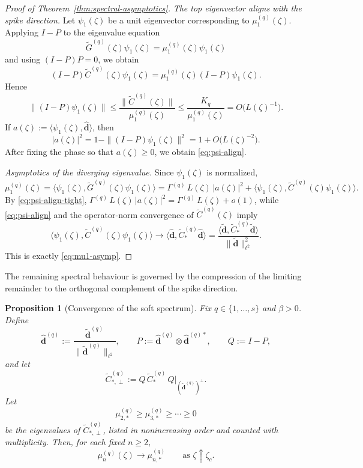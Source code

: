 \documentclass[11pt]{amsart}
\numberwithin{equation}{section}
\theoremstyle{plain}
\newtheorem{proposition}[theorem]{Proposition}
\theoremstyle{definition}
\theoremstyle{remark}
\begin{document}
\begin{proof}[Proof of Theorem~\ref{thm:spectral-asymptotics}]
	\smallskip
	\noindent\emph{The top eigenvector aligns with the spike direction.}
	Let \(\psi_1(\zeta)\) be a unit eigenvector corresponding to
	\(\mu_1^{(q)}(\zeta)\). Applying \(I-P\) to the eigenvalue equation
	\[
		\widetilde G^{(q)}(\zeta)\psi_1(\zeta)
		=
		\mu_1^{(q)}(\zeta)\psi_1(\zeta)
	\]
	and using \((I-P)P=0\), we obtain
	\[
		(I-P)\widetilde C^{(q)}(\zeta)\psi_1(\zeta)
		=
		\mu_1^{(q)}(\zeta)(I-P)\psi_1(\zeta).
	\]
	Hence
	\begin{equation}\label{eq:psi-align-tight}
		\|(I-P)\psi_1(\zeta)\|
		\le
		\frac{\|\widetilde C^{(q)}(\zeta)\|}{\mu_1^{(q)}(\zeta)}
		\le
		\frac{K_q}{\mu_1^{(q)}(\zeta)}
		=
		O\bigl(L(\zeta)^{-1}\bigr).
	\end{equation}
	If $a(\zeta):=\langle \psi_1(\zeta),\widehat{\bm d}\rangle$, then
	\[
		|a(\zeta)|^2
		=
		1-\|(I-P)\psi_1(\zeta)\|^2
		=
		1+O\bigl(L(\zeta)^{-2}\bigr).
	\]
	After fixing the phase so that \(a(\zeta)\ge0\), we obtain
	\eqref{eq:psi-align}.

	\smallskip
	\noindent\emph{Asymptotics of the diverging eigenvalue.}
	Since \(\psi_1(\zeta)\) is normalized,
	\[
		\mu_1^{(q)}(\zeta)
		=
		\langle \psi_1(\zeta),\widetilde G^{(q)}(\zeta)\psi_1(\zeta)\rangle
		=
		\Gamma^{(q)}\,L(\zeta)\,|a(\zeta)|^2
		+
		\langle \psi_1(\zeta),
		\widetilde C^{(q)}(\zeta)\psi_1(\zeta)\rangle.
	\]
	By \eqref{eq:psi-align-tight}, $
		\Gamma^{(q)}\,L(\zeta)\,|a(\zeta)|^2
		=
		\Gamma^{(q)}\,L(\zeta)+o(1)$,
	while \eqref{eq:psi-align} and the operator-norm convergence of
	\(\widetilde C^{(q)}(\zeta)\) imply
	\[
		\langle \psi_1(\zeta),
		\widetilde C^{(q)}(\zeta)\psi_1(\zeta)\rangle
		\to
		\langle \widehat{\bm d},\widetilde C_*^{(q)}\widehat{\bm d}\rangle
		=
		\frac{\langle \widetilde{\bm d},
			\widetilde C_*^{(q)}\widetilde{\bm d}\rangle}
		{\|\widetilde{\bm d}\|_{\ell^2}^2}.
	\]
	This is exactly \eqref{eq:mu1-asymp}.
\end{proof}

\FloatBarrier

The remaining spectral behaviour is governed by the compression of the limiting
remainder to the orthogonal complement of the spike direction.

\begin{proposition}[Convergence of the soft spectrum]
	\label{prop:soft-spectrum-convergence}
	Fix \(q\in\{1,\dots,s\}\) and \(\beta>0\). Define
	\[
		\widehat{\bm d}^{(q)}
		:=
		\frac{\widetilde{\bm d}^{(q)}}{\|\widetilde{\bm d}^{(q)}\|_{\ell^2}},
		\qquad
		P:=\widehat{\bm d}^{(q)}\otimes \widehat{\bm d}^{(q)*},
		\qquad
		Q:=I-P,
	\]
	and let
	\[
		\widetilde C_{*,\perp}^{(q)}
		:=
		Q\,\widetilde C_*^{(q)}\,Q\big|_{(\widetilde{\bm d}^{(q)})^\perp}.
	\]
	Let
	\[
		\mu_{2,*}^{(q)}\ge \mu_{3,*}^{(q)}\ge\cdots\ge0
	\]
	be the eigenvalues of \(\widetilde C_{*,\perp}^{(q)}\), listed in
	nonincreasing order and counted with multiplicity. Then, for each fixed
	\(n\ge2\),
	\begin{equation}\label{eq:soft-limit}
		\mu_n^{(q)}(\zeta)\longrightarrow \mu_{n,*}^{(q)}
		\qquad\text{as }\zeta\uparrow\zeta_c.
	\end{equation}
\end{proposition}
\end{document}
